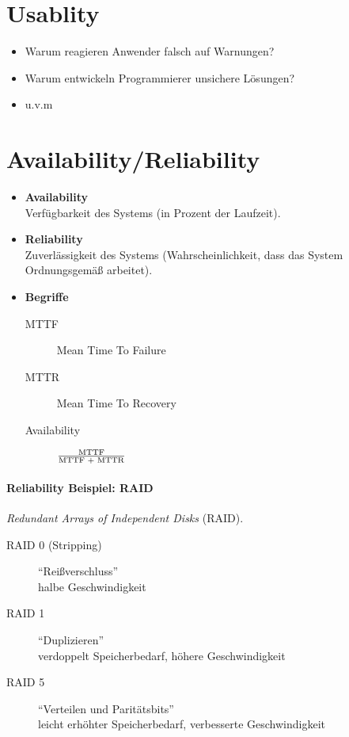 	\section{Usablity}
		\begin{itemize}
			\item Warum reagieren Anwender falsch auf Warnungen?
			\item Warum entwickeln Programmierer unsichere Lösungen?
			\item u.v.m
		\end{itemize}

	\section{Availability/Reliability}
		\begin{itemize}
			\item \textbf{Availability} \\ Verfügbarkeit des Systems (in Prozent der Laufzeit).
			\item \textbf{Reliability} \\ Zuverlässigkeit des Systems (Wahrscheinlichkeit, dass das System Ordnungsgemäß arbeitet).
			\item \textbf{Begriffe}
				\begin{description}
					\item[MTTF] Mean Time To Failure
					\item[MTTR] Mean Time To Recovery
					\item[Availability] \( \frac{\textrm{MTTF}}{\textrm{MTTF\ + \textrm{MTTR}}} \)
				\end{description}
		\end{itemize}

		\paragraph{Reliability Beispiel: RAID}
			\textit{Redundant Arrays of Independent Disks} (RAID).

			\begin{description}
				\item[RAID 0 (Stripping)] \enquote{Reißverschluss} \\ halbe Geschwindigkeit
				\item[RAID 1] \enquote{Duplizieren} \\ verdoppelt Speicherbedarf, höhere Geschwindigkeit
				\item[RAID 5] \enquote{Verteilen und Paritätsbits} \\ leicht erhöhter Speicherbedarf, verbesserte Geschwindigkeit
			\end{description}

